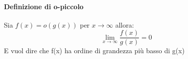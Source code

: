 \paragraph{Definizione di o-piccolo} Sia $f(x) = o(g(x))$ per $x \rightarrow \infty$ allora:
\begin{equation*}
	\lim_{x \rightarrow \infty}
	\frac{f(x)}{g(x)} = 0
\end{equation*}
\indent E vuol dire che f(x) ha ordine di grandezza più basso di g(x)

